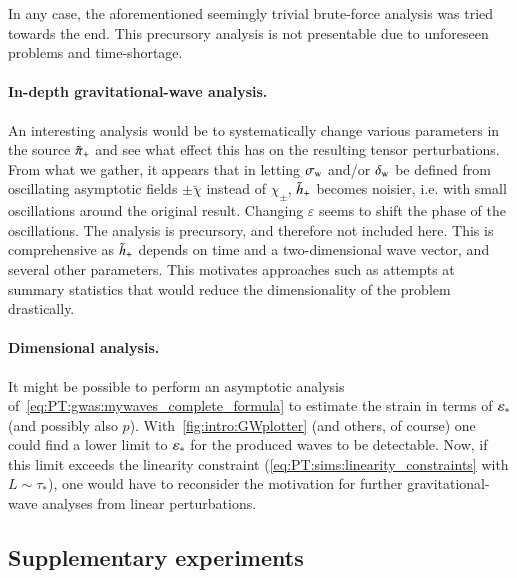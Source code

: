 In any case, the aforementioned seemingly trivial brute-force analysis was tried towards the end. This precursory analysis is not presentable due to unforeseen problems and time-shortage.



\paragraph{In-depth gravitational-wave analysis.} %
An interesting analysis would be to systematically change various parameters in the source $\tilde{\pi}_+$ and see what effect this has on the resulting tensor perturbations. From what we gather, it appears that in letting $\sigma_\mathrm{w}$ and/or $\delta_\mathrm{w}$ be defined from oscillating asymptotic fields $\pm \breve{\chi}$ instead of $\chi_\pm$, $\tilde{h}_+$ becomes noisier, i.e. with small oscillations around the original result. Changing $\varepsilon$ seems to shift the phase of the oscillations.
The analysis is precursory, and therefore not included here. %
This is comprehensive as 
$\tilde{h}_+$ depends on time and a two-dimensional wave vector, and several other parameters. This motivates approaches such as attempts at summary statistics that would reduce the dimensionality of the problem drastically. 



\paragraph{Dimensional analysis.} %
It might be possible to perform an asymptotic analysis of~\cref{eq:PT:gwas:mywaves_complete_formula} to estimate the strain in terms of $\varepsilon_\ast$ (and possibly also $p$). With~\cref{fig:intro:GWplotter} (and others, of course) one could find a lower limit to $\varepsilon_\ast$ for the produced waves to be detectable. Now, if this limit exceeds the linearity constraint (\cref{eq:PT:sims:linearity_constraints} with $L\sim \tau_\ast$), one would have to reconsider the motivation for further gravitational-wave analyses from linear perturbations.



\subsection{Supplementary experiments}\label{sec:whatif:cont:extra_sims}



